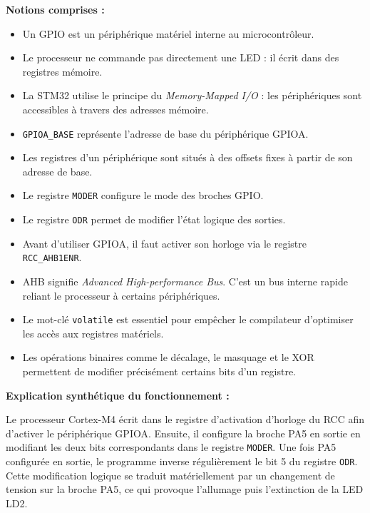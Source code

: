 \documentclass[11pt,a4paper]{article}
\begin{document}
\begin{sessionbox}
		\vspace{0.3cm}
		
		\textbf{Notions comprises :}
		
		\begin{itemize}
			\item Un GPIO est un périphérique matériel interne au microcontrôleur.
			\item Le processeur ne commande pas directement une LED : il écrit dans des registres mémoire.
			\item La STM32 utilise le principe du \textit{Memory-Mapped I/O} : les périphériques sont accessibles à travers des adresses mémoire.
			\item \texttt{GPIOA\_BASE} représente l'adresse de base du périphérique GPIOA.
			\item Les registres d'un périphérique sont situés à des offsets fixes à partir de son adresse de base.
			\item Le registre \texttt{MODER} configure le mode des broches GPIO.
			\item Le registre \texttt{ODR} permet de modifier l'état logique des sorties.
			\item Avant d'utiliser GPIOA, il faut activer son horloge via le registre \texttt{RCC\_AHB1ENR}.
			\item AHB signifie \textit{Advanced High-performance Bus}. C'est un bus interne rapide reliant le processeur à certains périphériques.
			\item Le mot-clé \texttt{volatile} est essentiel pour empêcher le compilateur d'optimiser les accès aux registres matériels.
			\item Les opérations binaires comme le décalage, le masquage et le XOR permettent de modifier précisément certains bits d'un registre.
		\end{itemize}
		
		\vspace{0.3cm}
		
		\textbf{Explication synthétique du fonctionnement :}
		
		Le processeur Cortex-M4 écrit dans le registre d'activation d'horloge du RCC afin d'activer le périphérique GPIOA. Ensuite, il configure la broche PA5 en sortie en modifiant les deux bits correspondants dans le registre \texttt{MODER}. Une fois PA5 configurée en sortie, le programme inverse régulièrement le bit 5 du registre \texttt{ODR}. Cette modification logique se traduit matériellement par un changement de tension sur la broche PA5, ce qui provoque l'allumage puis l'extinction de la LED LD2.
		

\end{sessionbox}
\end{document}
